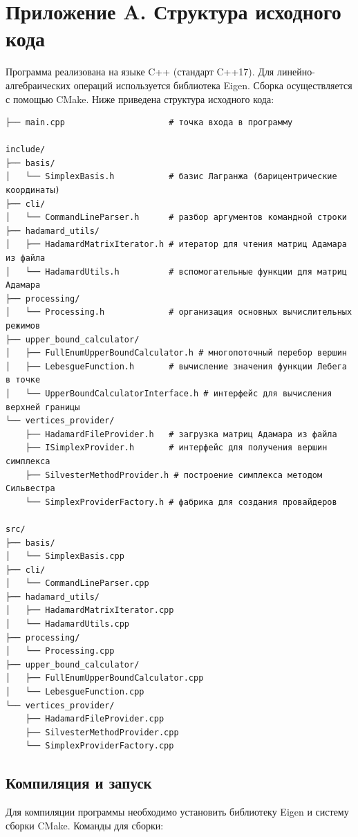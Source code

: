 \documentclass[appendix_A]{subfiles}
\begin{document}
\section*{Приложение A. Структура исходного кода}

Программа реализована на языке C++ (стандарт C++17). Для линейно-алгебраических операций используется библиотека Eigen. Сборка осуществляется с помощью CMake. Ниже приведена структура исходного кода:

\begin{verbatim}
├── main.cpp                     # точка входа в программу

include/
├── basis/
│   └── SimplexBasis.h           # базис Лагранжа (барицентрические координаты)
├── cli/
│   └── CommandLineParser.h      # разбор аргументов командной строки
├── hadamard_utils/
│   ├── HadamardMatrixIterator.h # итератор для чтения матриц Адамара из файла
│   └── HadamardUtils.h          # вспомогательные функции для матриц Адамара
├── processing/
│   └── Processing.h             # организация основных вычислительных режимов
├── upper_bound_calculator/
│   ├── FullEnumUpperBoundCalculator.h # многопоточный перебор вершин
│   ├── LebesgueFunction.h       # вычисление значения функции Лебега в точке
│   └── UpperBoundCalculatorInterface.h # интерфейс для вычисления верхней границы
└── vertices_provider/
    ├── HadamardFileProvider.h   # загрузка матриц Адамара из файла
    ├── ISimplexProvider.h       # интерфейс для получения вершин симплекса
    ├── SilvesterMethodProvider.h # построение симплекса методом Сильвестра
    └── SimplexProviderFactory.h # фабрика для создания провайдеров

src/
├── basis/
│   └── SimplexBasis.cpp
├── cli/
│   └── CommandLineParser.cpp
├── hadamard_utils/
│   ├── HadamardMatrixIterator.cpp
│   └── HadamardUtils.cpp
├── processing/
│   └── Processing.cpp
├── upper_bound_calculator/
│   ├── FullEnumUpperBoundCalculator.cpp
│   └── LebesgueFunction.cpp
└── vertices_provider/
    ├── HadamardFileProvider.cpp
    ├── SilvesterMethodProvider.cpp
    └── SimplexProviderFactory.cpp
\end{verbatim}

\subsection*{Компиляция и запуск}

Для компиляции программы необходимо установить библиотеку Eigen и систему сборки CMake. Команды для сборки:
\end{document}

